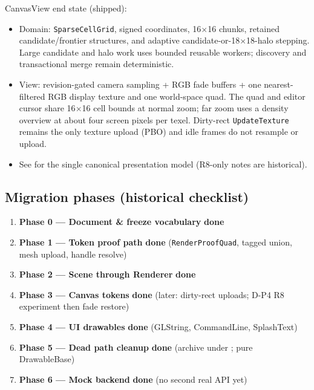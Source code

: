CanvasView end state (shipped):
\begin{itemize}
  \item Domain: \texttt{SparseCellGrid}, signed coordinates, 16$\times$16
        chunks, retained candidate/frontier structures, and adaptive
        candidate-or-18$\times$18-halo stepping. Large candidate and halo work
        uses bounded reusable workers; discovery and transactional merge remain
        deterministic.
  \item View: revision-gated camera sampling + RGB fade buffers + one
        nearest-filtered RGB display texture and one world-space quad. The
        quad and editor cursor share 16$\times$16 cell bounds at normal zoom;
        far zoom uses a density overview at about four screen pixels per
        texel. Dirty-rect \texttt{UpdateTexture} remains the only texture
        upload (PBO) and idle frames do not resample or upload.
  \item See  for the single canonical
        presentation model (R8-only notes are historical).
\end{itemize}

\subsection{Migration phases (historical checklist)}
\label{sec:migration-phases}

\begin{enumerate}[leftmargin=*]
  \item \textbf{Phase 0 --- Document \& freeze vocabulary} \quad \textbf{done}
  \item \textbf{Phase 1 --- Token proof path} \quad \textbf{done}
        (\texttt{RenderProofQuad}, tagged union, mesh upload, handle resolve)
  \item \textbf{Phase 2 --- Scene through Renderer} \quad \textbf{done}
  \item \textbf{Phase 3 --- Canvas tokens} \quad \textbf{done}
        (later: dirty-rect uploads; D-P4 R8 experiment then fade restore)
  \item \textbf{Phase 4 --- UI drawables} \quad \textbf{done}
        (GLString, CommandLine, SplashText)
  \item \textbf{Phase 5 --- Dead path cleanup} \quad \textbf{done}
        (archive under ; pure DrawableBase)
  \item \textbf{Phase 6 --- Mock backend} \quad \textbf{done}
        (no second real API yet)
\end{enumerate}

